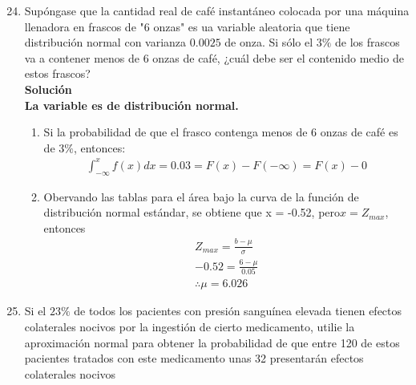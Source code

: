 
\begin{enumerate}
	\setcounter{enumi}{23} %
	\item Supóngase que la cantidad real de café instantáneo colocada por una máquina llenadora en frascos de "6 onzas" es ua variable aleatoria que tiene distribución normal con varianza $0.0025$ de onza. Si sólo el $3\%$ de los frascos va a contener menos de 6 onzas de café, ¿cuál debe ser el contenido medio de estos frascos?\\
	\textbf{Solución}\\
	\textbf{La variable es de distribución normal.}
    \begin{enumerate}
        \item Si la probabilidad de que el frasco contenga menos de 6 onzas de café es de $3\%$, entonces:
        \begin{gather*}
            \int_{-\infty}^{x}f(x)dx=0.03=F(x)-F(-\infty)=F(x)-0
    	\end{gather*}
    	\item Obervando las tablas para el área bajo la curva de la función de distribución normal estándar, se obtiene que x = -0.52, pero$x = Z_{max}$, entonces\\
    	\begin{gather*}
    		Z_{max} = \frac{b-\mu}{\sigma}\\
    		-0.52=\frac{6 -\mu}{0.05}\\
		\therefore	\mu = 6.026
    	\end{gather*}
    \end{enumerate}



	\item Si el $23\%$ de todos los pacientes con presión sanguínea elevada tienen efectos colaterales nocivos por la ingestión de cierto medicamento, utilie la aproximación normal para obtener la probabilidad de que entre 120 de estos pacientes tratados con este medicamento unas 32 presentarán efectos colaterales nocivos


\end{enumerate}
